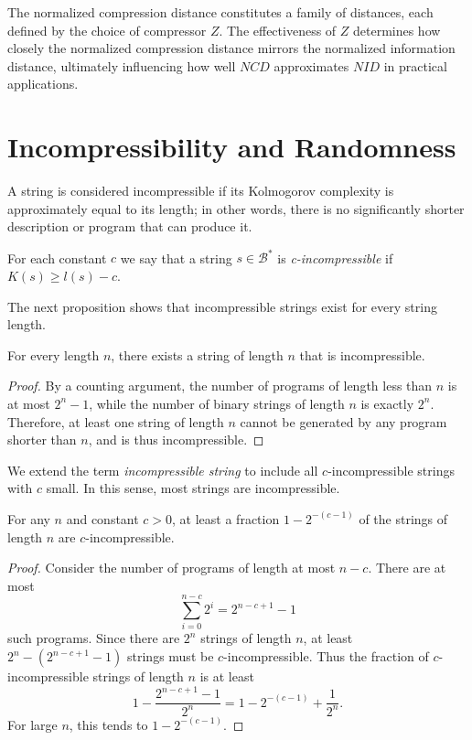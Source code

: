 The normalized compression distance constitutes a family of distances, each defined by the choice of compressor $Z$. The effectiveness of $Z$ determines how closely the normalized compression distance mirrors the normalized information distance, ultimately influencing how well $NCD$ approximates $NID$ in practical applications.

%
%

\section{Incompressibility and Randomness}
\label{sec:incompressibility_randomness}

A string is considered incompressible if its Kolmogorov complexity is approximately equal to its length; in other words, there is no significantly shorter description or program that can produce it.

\begin{definition}
For each constant $c$ we say that a string $s \in \mathcal{B}^{\ast}$ is \emph{c-incompressible} if $K(s) \geq l(s) - c$.
\end{definition}

The next proposition shows that incompressible strings exist for every string length.

\begin{proposition}
For every length $n$, there exists a string of length $n$ that is incompressible.
\end{proposition}
\begin{proof}
By a counting argument, the number of programs of length less than $n$ is at most $2^n - 1$, while the number of binary strings of length $n$ is exactly $2^n$. Therefore, at least one string of length $n$ cannot be generated by any program shorter than $n$, and is thus incompressible.
\end{proof}

We extend the term \emph{incompressible string} to include all $c$-incompressible strings with $c$ small. In this sense, most strings are incompressible.

\begin{proposition}
For any $n$ and constant $c > 0$, at least a fraction $1 - 2^{-(c-1)}$ of the strings of length $n$ are $c$-incompressible.
\end{proposition}
\begin{proof}
Consider the number of programs of length at most $n-c$. There are at most
\[
\sum_{i=0}^{n-c} 2^i = 2^{n-c+1} - 1
\]
such programs. Since there are $2^n$ strings of length $n$, at least $2^n - (2^{n-c+1}-1)$ strings must be $c$-incompressible. Thus the fraction of $c$-incompressible strings of length $n$ is at least
\[
1 - \frac{2^{n-c+1}-1}{2^n} = 1 - 2^{-(c-1)} + \frac{1}{2^n}.
\]
For large $n$, this tends to $1 - 2^{-(c-1)}$.
\end{proof}


